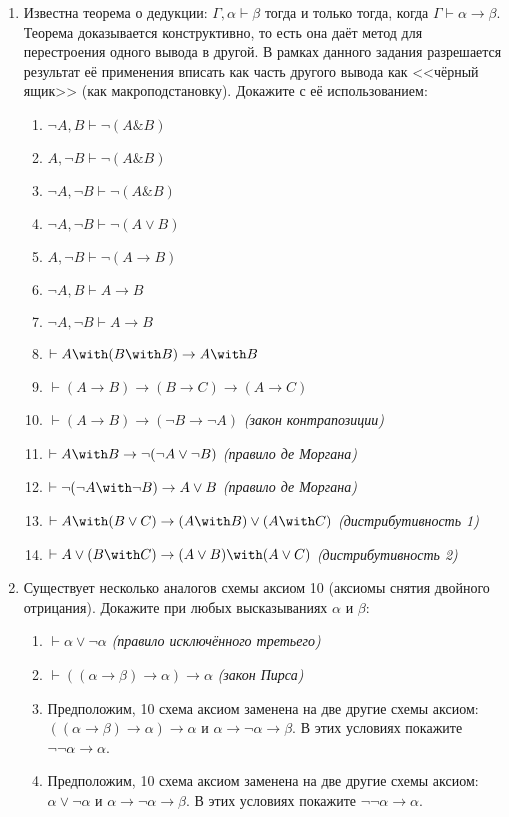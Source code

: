 \documentclass[10pt,a4paper,oneside]{article}
\begin{document}
\begin{enumerate}
\item Известна теорема о дедукции: $\Gamma, \alpha \vdash \beta$ тогда и только тогда, 
когда $\Gamma \vdash \alpha \rightarrow \beta$. Теорема доказывается конструктивно, то есть
она даёт метод для перестроения одного вывода в другой.
В рамках данного задания разрешается результат её применения вписать как часть другого вывода 
как <<чёрный ящик>> (как макроподстановку). Докажите с её использованием:
\begin{enumerate}
\item $\neg A, B \vdash \neg(A\& B)$
\item $A,\neg B \vdash \neg( A\& B)$
\item $\neg A,\neg B \vdash \neg( A\& B)$
\item $\neg A,\neg B \vdash \neg( A\vee B)$
\item $ A,\neg B \vdash \neg( A\rightarrow B)$
\item $\neg A, B \vdash  A\rightarrow B$
\item $\neg A,\neg B \vdash  A\rightarrow B$
\item $\vdash A \with (B \with B) \rightarrow A \with B$
\item $\vdash (A \rightarrow B) \rightarrow (B \rightarrow C) \rightarrow (A \rightarrow C)$
\item $\vdash (A \rightarrow B) \rightarrow (\neg B \rightarrow \neg A)$ \emph{(закон контрапозиции)}
\item $\vdash A \with B \rightarrow \neg (\neg A \vee \neg B)$ \emph{(правило де Моргана)}
\item $\vdash \neg (\neg A \with \neg B) \rightarrow A \vee B$ \emph{(правило де Моргана)}
\item $\vdash A \with (B \vee C) \rightarrow (A \with B) \vee (A \with C)$ \emph{(дистрибутивность 1)}
\item $\vdash A \vee (B \with C) \rightarrow (A \vee B) \with (A \vee C)$ \emph{(дистрибутивность 2)}
\end{enumerate}

\item Существует несколько аналогов схемы аксиом 10 (аксиомы снятия двойного отрицания). Докажите при любых
высказываниях $\alpha$ и $\beta$:
\begin{enumerate}
\item $\vdash \alpha \vee \neg \alpha$ \emph{(правило исключённого третьего)}
\item $\vdash ((\alpha \rightarrow \beta) \rightarrow \alpha)\rightarrow \alpha$ \emph{(закон Пирса)}
\item Предположим, 10 схема аксиом заменена на две другие схемы аксиом: 
$((\alpha\rightarrow\beta)\rightarrow\alpha)\rightarrow\alpha$ и $\alpha\rightarrow\neg\alpha\rightarrow\beta$.
В этих условиях покажите $\neg\neg \alpha\rightarrow \alpha$.
\item Предположим, 10 схема аксиом заменена на две другие схемы аксиом: 
$\alpha\vee\neg\alpha$ и $\alpha\rightarrow\neg\alpha\rightarrow\beta$.
В этих условиях покажите 
$\neg\neg \alpha\rightarrow \alpha$.
\end{enumerate}


\end{enumerate}
\end{document}
